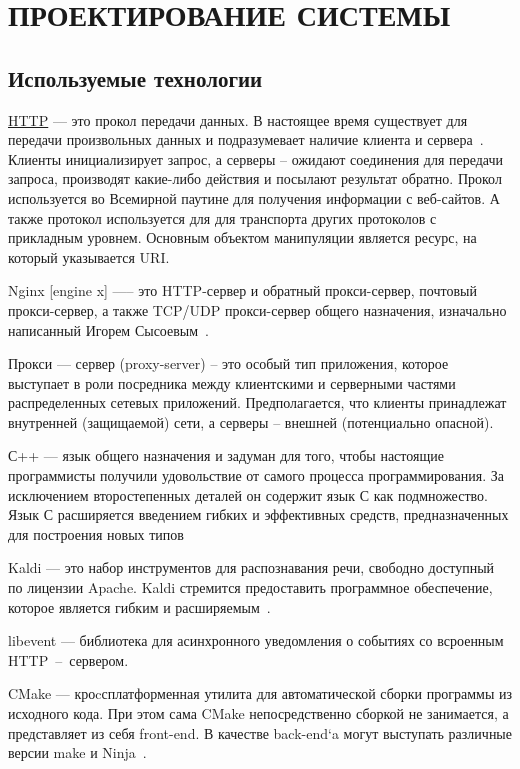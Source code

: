 \chapter{ПРОЕКТИРОВАНИЕ СИСТЕМЫ}

\section{Используемые технологии}

\hyperlink{http}{HTTP} --- это прокол передачи данных. В настоящее время существует для передачи
произвольных данных и подразумевает наличие клиента и сервера~\cite{http}.
Клиенты инициализирует запрос, а серверы – ожидают соединения для передачи
запроса, производят какие-либо действия и посылают результат обратно. Прокол
используется во Всемирной паутине для получения информации с веб-сайтов. А
также протокол используется для для транспорта других протоколов с прикладным
уровнем. Основным объектом манипуляции является ресурс, на который указывается URI.

Nginx [engine x] —-- это HTTP-сервер и обратный прокси-сервер, почтовый
прокси-сервер, а также TCP/UDP прокси-сервер общего назначения, изначально
написанный Игорем Сысоевым~\cite{nginx}.

Прокси --- сервер (proxy-server) – это особый тип приложения, которое
выступает в роли посредника между клиентскими и серверными частями
распределенных сетевых приложений. Предполагается, что клиенты принадлежат
внутренней (защищаемой) сети, а серверы – внешней (потенциально опасной).

С++ --- язык общего назначения и задуман для того, чтобы настоящие программисты получили
удовольствие от самого процесса программирования. За исключением второстепенных деталей он
содержит язык С как подмножество. Язык С расширяется введением гибких и эффективных средств,
предназначенных для построения новых типов~\cite{cpp}

Kaldi --- это набор инструментов для распознавания речи, свободно доступный по
лицензии Apache. Kaldi стремится предоставить программное обеспечение, которое
является гибким и расширяемым~\cite{kaldi}.

libevent --- библиотека для асинхронного уведомления о событиях со всроенным
HTTP~--~сервером.

CMake — кроcсплатформенная утилита для автоматической сборки программы из
исходного кода. При этом сама CMake непосредственно сборкой не занимается,
а представляет из себя front-end. В качестве back-end`a могут выступать
различные версии make и Ninja~\cite{cmake}.

